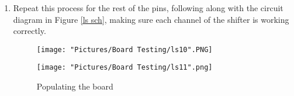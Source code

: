\documentclass[12pt]{article}
\begin{document}
\begin{enumerate}
	\item Repeat this process for the rest of the pins, following along with the circuit diagram in Figure \ref{ls sch}, making sure each channel of the shifter is working correctly. 

\begin{figure}[H]
 	\centering
  	\begin{minipage}[b]{0.45\textwidth}
		\texttt{[image: "Pictures/Board Testing/ls10".PNG]}
  	\end{minipage}
  	\hfill
  	\begin{minipage}[b]{0.45\textwidth}
    		\texttt{[image: "Pictures/Board Testing/ls11".png]}
  	\end{minipage}
	\caption{Populating the board}
	\label{ls2}
\end{figure}

\end{enumerate}
\end{document}
